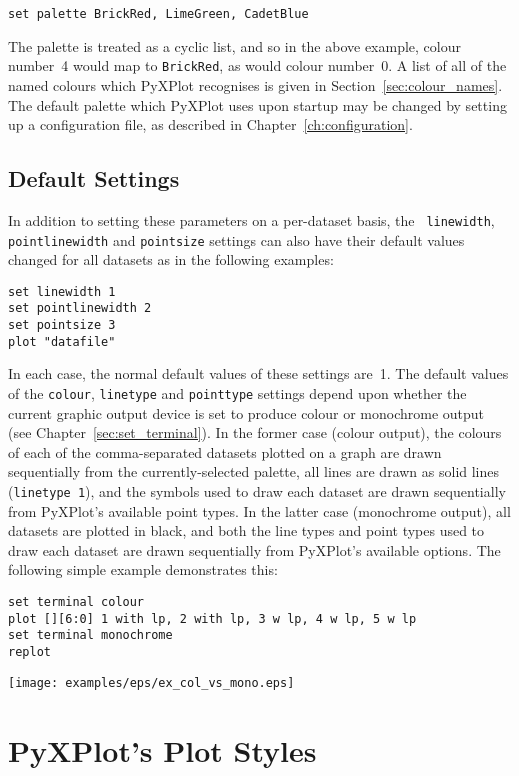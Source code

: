 \begin{verbatim}
set palette BrickRed, LimeGreen, CadetBlue
\end{verbatim}

\noindent The palette is treated as a cyclic list, and so in the above example,
colour number~4 would map to {\tt BrickRed}, as would colour number~0. A list
of all of the named colours which PyXPlot recognises is given in
Section~\ref{sec:colour_names}. The default palette which PyXPlot uses upon
startup may be changed by setting up a configuration file, as described in
Chapter~\ref{ch:configuration}.

\subsection{Default Settings}

In addition to setting these parameters on a per-dataset basis, the {\tt
linewidth}, {\tt pointlinewidth} and {\tt pointsize} settings can also have
their default values changed for all datasets as in the following examples:
\begin{verbatim}
set linewidth 1
set pointlinewidth 2
set pointsize 3
plot "datafile"
\end{verbatim}
In each case, the normal default values of these settings are~1. The default
values of the {\tt colour}, {\tt linetype} and {\tt pointtype} settings depend
upon whether the current graphic output device is set to produce colour or
monochrome output (see Chapter~\ref{sec:set_terminal}). In the former case
(colour output), the colours of each of the comma-separated datasets plotted on
a graph are drawn sequentially from the currently-selected palette, all lines
are drawn as solid lines ({\tt line\-type~1}), and the symbols used to draw
each dataset are drawn sequentially from PyXPlot's available point types. In
the latter case (monochrome output), all datasets are plotted in black, and
both the line types and point types used to draw each dataset are drawn
sequentially from PyXPlot's available options. The following simple example
demonstrates this:
\begin{verbatim}
set terminal colour
plot [][6:0] 1 with lp, 2 with lp, 3 w lp, 4 w lp, 5 w lp
set terminal monochrome
replot
\end{verbatim}
\centerline{\texttt{[image: examples/eps/ex\_col\_vs\_mono.eps]}}

\section{PyXPlot's Plot Styles}

